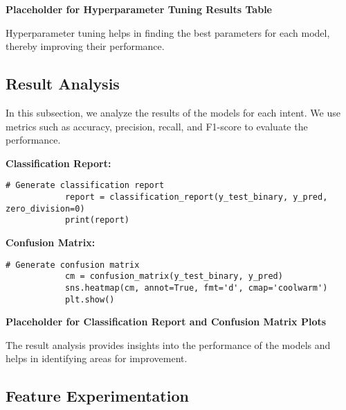         \vspace{1em}

        \textbf{Placeholder for Hyperparameter Tuning Results Table}

        Hyperparameter tuning helps in finding the best parameters for each model, thereby improving their performance.
            
    \subsection{Result Analysis}
    
        In this subsection, we analyze the results of the models for each intent. We use metrics such as accuracy, precision, recall, and F1-score to evaluate the performance.

        \textbf{Classification Report:}

        \begin{lstlisting}[caption={Generate classification report}, label={lst:classification_report}]
            # Generate classification report
            report = classification_report(y_test_binary, y_pred, zero_division=0)
            print(report)
        \end{lstlisting}
        
        \vspace{1em}

        \textbf{Confusion Matrix:}

        \begin{lstlisting}[caption={Generate confusion matrix}, label={lst:confusion_matrix}]
            # Generate confusion matrix
            cm = confusion_matrix(y_test_binary, y_pred)
            sns.heatmap(cm, annot=True, fmt='d', cmap='coolwarm')
            plt.show()
        \end{lstlisting}
        
        \vspace{1em}

        \textbf{Placeholder for Classification Report and Confusion Matrix Plots}

        The result analysis provides insights into the performance of the models and helps in identifying areas for improvement.
            
    \subsection{Feature Experimentation}
    
